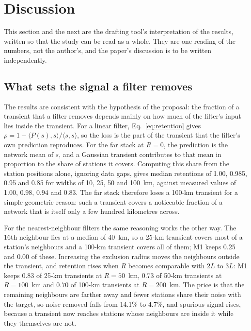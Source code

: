 \section{Discussion}
\label{sec:discussion}

This section and the next are the drafting tool's interpretation of the results, written so that the study can be read as a whole. They are one reading of the numbers, not the author's, and the paper's discussion is to be written independently.

\subsection{What sets the signal a filter removes}

The results are consistent with the hypothesis of the proposal: the fraction of a transient that a filter removes depends mainly on how much of the filter's input lies inside the transient. For a linear filter, Eq.~\eqref{eq:retention} gives $\rho = 1 - \langle P(s), s\rangle / \langle s, s \rangle$, so the loss is the part of the transient that the filter's own prediction reproduces. For the far stack at $R = 0$, the prediction is the network mean of $s$, and a Gaussian transient contributes to that mean in proportion to the share of stations it covers. Computing this share from the station positions alone, ignoring data gaps, gives median retentions of 1.00, 0.985, 0.95 and 0.85 for widths of 10, 25, 50 and 100~km, against measured values of 1.00, 0.98, 0.94 and 0.83. The far stack therefore loses a 100-km transient for a simple geometric reason: such a transient covers a noticeable fraction of a network that is itself only a few hundred kilometres across.

For the nearest-neighbour filters the same reasoning works the other way. The 16th neighbour lies at a median of 40~km, so a 25-km transient covers most of a station's neighbours and a 100-km transient covers all of them; M1 keeps 0.25 and 0.00 of these. Increasing the exclusion radius moves the neighbours outside the transient, and retention rises when $R$ becomes comparable with $2L$ to $3L$: M1 keeps 0.83 of 25-km transients at $R = 50$~km, 0.73 of 50-km transients at $R = 100$~km and 0.70 of 100-km transients at $R = 200$~km. The price is that the remaining neighbours are farther away and fewer stations share their noise with the target, so noise removed falls from 14.1\% to 4.7\%, and spurious signal rises, because a transient now reaches stations whose neighbours are inside it while they themselves are not.

